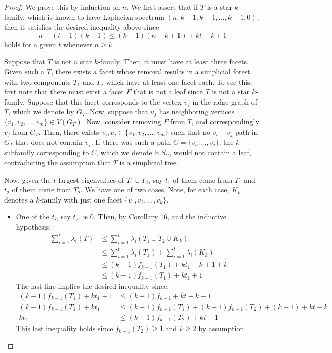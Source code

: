 \documentclass[11pt]{article}
\begin{document}
\begin{proof}

We prove this by induction on $n$.
We first assert that if $T$ is a star $k$-family, which is known to have Laplacian spectrum $( n, k - 1, k - 1, \ldots, k -1, 0 )$, then it satisfies the desired inequality above since
$$ n + (t - 1)(k - 1) \leq (k - 1)(n - k + 1) + kt - k + 1$$
holds for a given $t$ whenever $n \geq k$.


Suppose that $T$ is not a star $k$-family. Then, it must have at least three facets. Given such a $T$, there exists a facet whose removal results in a simplicial forest with two components $T_1$ and $T_2$ which have at least one facet each. To see this, first note that there must exist a facet $F$ that is not a leaf since $T$ is not a star $k$-family. Suppose that this facet corresponds to the vertex $v_f$ in the ridge graph of $T$, which we denote by $G_T$. Now, suppose that $v_f$ has neighboring vertices $\{v_1, v_2, \ldots, v_m\} \in V(G_T)$. Now, consider removing $F$ from $T$, and correspondingly $v_f$ from $G_T$. Then, there exists $v_i, v_j \in \{v_1, v_2, \ldots, v_m\}$ such that no $v_i - v_j$ path in $G_T$ that does not contain $v_f$. If there was such a path $C = \{v_i, \ldots, v_j\}$, the $k$-subfamily corresponding to $C$, which we denote b $S_C$, would not contain a leaf, contradicting the assumption that $T$ is a simplicial tree.


Now, given the $t$ largest eigenvalues of $T_1 \sqcup T_2$, say $t_1$ of them come from $T_1$ and $t_2$ of them come from $T_2$. We have one of two cases. Note, for each case, $K_k$ denotes a $k$-family with just one facet $\{v_1, v_2, \ldots, v_k\}$.

\begin{itemize}
\item[Case 1.] One of the $t_i$, say $t_2$, is 0. Then, by Corollary 16, and the inductive hypothesis,
\begin{align*}
\sum_{i = 1}^t \lambda_i (T) &\leq \sum_{i = 1}^t \lambda_i(T_1 \cup T_2 \cup K_k)\\
& \leq \sum_{i = 1}^t \lambda_{i} (T_1) + \sum_{i = 1}^t \lambda_i (K_k)\\
& \leq (k - 1) f_{k - 1}(T_1) + k t_1 - k + 1 + k \\
& \leq (k - 1) f_{k - 1}(T_1) + k t_1 +1
\end{align*}
\noindent The last line implies the desired inequality since:
\begin{align*}
(k - 1) f_{k - 1}(T_1) + k t_1 +1 & \leq (k-1) f_{k - 1} + kt - k + 1\\
(k - 1) f_{k - 1}(T_1) + k t_1 & \leq (k-1) f_{k - 1}(T_1) + (k-1)f_{k-1}(T_2) + (k - 1) + kt - k \\
k t_1 & \leq (k-1)f_{k-1}(T_2) + kt - 1
\end{align*}
\noindent This last inequality holds since $f_{k-1}(T_2) \geq 1$ and $k \geq 2$ by assumption.


\end{itemize}
\end{proof}
\end{document}
